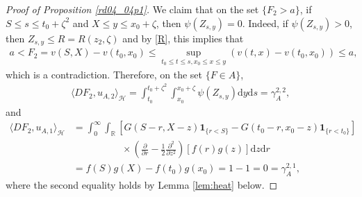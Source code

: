 \documentclass[12pt,a4paper]{article}
\newcommand{\R}{{\mathbb{R}}}
\newcommand{\HH}{\mathcal{H}}
\renewcommand{\d}{\mathrm{d}}
\newcommand {\deltah}{{\zeta}}
\newcommand{\<}{\langle}
\renewcommand{\>}{\rangle}
\begin{document}
\begin{proof}[Proof of Proposition \ref{rd04_04p1}]
 We claim that on the set $ \{F_2>a\}$, if $S\leq s \leq t_0+\deltah^2$ and $X\leq y\leq x_0+\deltah$, then $\psi(Z_{s,y})=0$. Indeed, if $\psi(Z_{s,y}) > 0$,
 then $Z_{s,y}\leq R = R(z_2, \deltah)$ and by \eqref{R}, this implies that 
 \begin{align*}
 a<F_2= v(S,X)-v(t_0, x_0) \leq  \sup_{t_0\leq t\leq s, x_0\leq x\leq y}(v(t,x)-v(t_0, x_0)) \leq a,
 \end{align*}
 which is a contradiction. Therefore, on the set $\{F\in A\}$,  
 \begin{align}\label{for3a}
  \langle DF_2, u_{A,2}\rangle_{\mathcal{H}} = \int_{t_0}^{t_0+\deltah^2}\int_{x_0}^{x_0+\deltah}\psi(Z_{s,y})\d y\d s = \gamma^{2,2}_A,
 \end{align}
    and
   \begin{align}\nonumber
    \langle DF_2, u_{A,1} \rangle_\HH& =\int_0^{\infty}\int_\R \left[G(S-r, X-z)\bm{1}_{\{r<S\}} -  G(t_0-r, x_0-z)\bm{1}_{\{r<t_0\}} \right]  \\   \nonumber 
   &\qquad \qquad\quad \times \left(\frac{\partial }{\partial r}-\frac 12 \frac{\partial^2}{\partial z^2}\right)[f(r)g(z)] \d z \d r\\
   &= f(S)g(X) -f(t_0)g(x_0)= 1-1=0 = \gamma_A^{2,1}, \label{for1}
   \end{align}
   where the second  equality holds by Lemma \ref{lem:heat} below. 
  

\end{proof}
\end{document}
